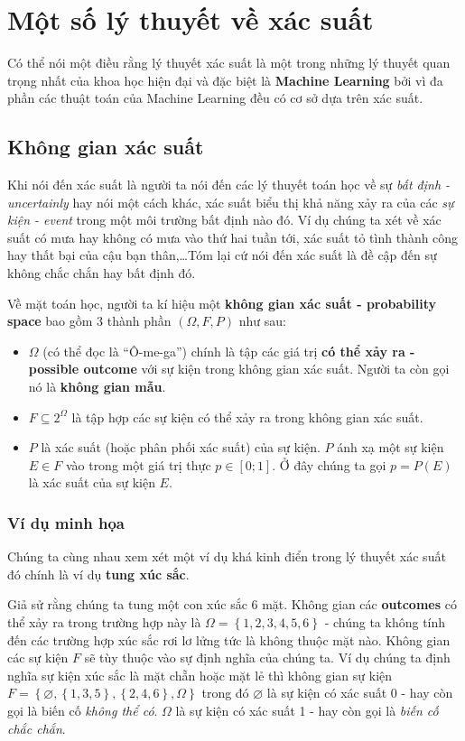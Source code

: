 \documentclass[../main-report.tex]{subfiles}
\begin{document}
\section{Một số lý thuyết về xác suất}
Có thể nói một điều rằng lý thuyết xác suất là một trong những lý thuyết quan trọng nhất của khoa học hiện đại và đặc biệt là \textbf{Machine Learning} bởi vì đa phần các thuật toán của Machine Learning đều có cơ sở dựa trên xác suất.
\subsection{Không gian xác suất}
Khi nói đến xác suất là người ta nói đến các lý thuyết toán học về sự \textit{bất định - uncertainly} hay nói một cách khác, xác suất biểu thị khả năng xảy ra của các \textit{sự kiện - event} trong một môi trường bất định nào đó. Ví dụ chúng ta xét về xác suất có mưa hay không có mưa vào thứ hai tuần tới, xác suất tỏ tình thành công hay thất bại của cậu bạn thân,\ldots Tóm lại cứ nói đến xác suất là đề cập đến sự không chắc chắn hay bất định đó.

Về mặt toán học, người ta kí hiệu một \textbf{không gian xác suất - probability space} bao gồm 3 thành phần $(\Omega, F, P)$ như sau:

\begin{itemize}
\item $\Omega$ (có thể đọc là ``Ô-me-ga'') chính là tập các giá trị \textbf{có thể xảy ra - possible outcome} với sự kiện trong không gian xác suất. Người ta còn gọi nó là \textbf{không gian mẫu}.
\item $F \subseteq 2^{\Omega}$ là tập hợp các sự kiện có thể xảy ra trong không gian xác suất.
\item $P$ là xác suất (hoặc phân phối xác suất) của sự kiện. $P$ ánh xạ một sự kiện $E \in F$ vào trong một giá trị thực $p \in \left [ 0;1 \right ]$. Ở đây chúng ta gọi $p = P(E)$ là xác suất của sự kiện $E$.
\end{itemize}

\subsubsection*{Ví dụ minh họa}
Chúng ta cùng nhau xem xét một ví dụ khá kinh điển trong lý thuyết xác suất đó chính là ví dụ \textbf{tung xúc sắc}.

Giả sử rằng chúng ta tung một con xúc sắc 6 mặt. Không gian các \textbf{outcomes} có thể xảy ra trong trường hợp này là $\Omega = \left \{ 1, 2, 3, 4, 5, 6 \right \}$ - chúng ta không tính đến các trường hợp xúc sắc rơi lơ lửng tức là không thuộc mặt nào. Không gian các sự kiện $F$ sẽ tùy thuộc vào sự định nghĩa của chúng ta. Ví dụ chúng ta định nghĩa sự kiện xúc sắc là mặt chẵn hoặc mặt lẻ thì không gian sự kiện $F=\left \{ \varnothing , \left \{ 1, 3, 5 \right \}, \left \{ 2, 4, 6 \right \}, \Omega \right \}$ trong đó $\varnothing$ là sự kiện có xác suất 0 - hay còn gọi là biến cố \textit{không thể có}. $\Omega$ là sự kiện có xác suất 1 - hay còn gọi là \textit{biến cố chắc chắn}.
\end{document}
